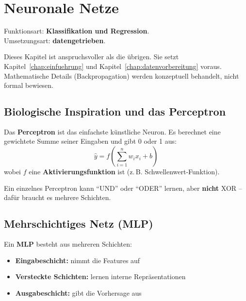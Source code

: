 \chapter{Neuronale Netze}
\label{chap:neuronale-netze}

\begin{myremark}
Funktionsart: \textbf{Klassifikation und Regression}. \\
Umsetzungsart: \textbf{datengetrieben}.
\end{myremark}

\begin{myremark}
Dieses Kapitel ist anspruchsvoller als die übrigen.
Sie setzt Kapitel~\cref{chap:einfuehrung} und Kapitel~\cref{chap:datenvorbereitung} voraus. Mathematische Details (Backpropagation) werden
konzeptuell behandelt, nicht formal bewiesen.
\end{myremark}

\section{Biologische Inspiration und das Perceptron}

\begin{mydefinition}[Perceptron]
Das \textbf{Perceptron} ist das einfachste künstliche Neuron.
Es berechnet eine gewichtete Summe seiner Eingaben und gibt 0 oder 1 aus:
\[
\hat{y} = f\!\left(\sum_{i=1}^{n} w_i x_i + b\right)
\]
wobei $f$ eine \textbf{Aktivierungsfunktion} ist (z.\,B. Schwellenwert-Funktion).
\end{mydefinition}

\begin{myexample}
Ein einzelnes Perceptron kann \enquote{UND} oder \enquote{ODER} lernen,
aber \textbf{nicht} XOR – dafür braucht es mehrere Schichten.
\end{myexample}

\section{Mehrschichtiges Netz (MLP)}

\begin{mydefinition}
Ein \textbf{MLP} besteht aus mehreren Schichten:
\begin{itemize}
    \item \textbf{Eingabeschicht:} nimmt die Features auf
    \item \textbf{Versteckte Schichten:} lernen interne Repräsentationen
    \item \textbf{Ausgabeschicht:} gibt die Vorhersage aus
\end{itemize}
\end{mydefinition}

